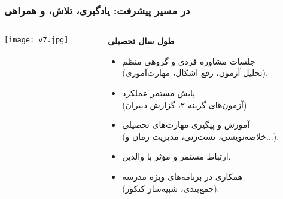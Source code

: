 \documentclass[aspectratio=169]{beamer}
\begin{document}
\begin{frame}[fragile]
  \frametitle{در مسیر پیشرفت: یادگیری، تلاش، و همراهی}

  \begin{columns}[T]
    \begin{column}{0.4\textwidth}
      \texttt{[image: v7.jpg]}
    \end{column}

    \begin{column}{0.55\textwidth}
      \begin{flushright}
        \textbf{طول سال تحصیلی}
      \end{flushright}
      \begin{itemize}\setlength{\itemsep}{3pt}\setlength{\parsep}{2pt}
        \item جلسات مشاوره فردی و گروهی منظم\\(تحلیل آزمون، رفع اشکال، مهارت‌آموزی).
        \item پایش مستمر عملکرد\\(آزمون‌های گزینه ۲، گزارش دبیران).
        \item آموزش و پیگیری مهارت‌های تحصیلی\\(خلاصه‌نویسی، تست‌زنی، مدیریت زمان و...).
        \item ارتباط مستمر و مؤثر با والدین.
        \item همکاری در برنامه‌های ویژه مدرسه\\(جمع‌بندی، شبیه‌ساز کنکور).
      \end{itemize}
    \end{column}
  \end{columns}
\end{frame}
\end{document}
